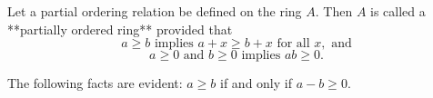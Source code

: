 Let a partial ordering relation be defined on the ring $A$. Then $A$ is called a **partially ordered ring** provided that
$$a \geq b \text{ implies } a + x \geq b + x \text{ for all } x, \text{ and}$$
$$a \geq 0 \text{ and } b \geq 0 \text{ implies } ab \geq 0.$$

The following facts are evident: $a \geq b$ if and only if $a - b \geq 0$.
